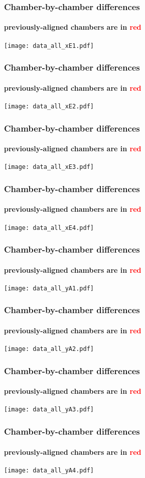 \documentclass[compress]{beamer}
\begin{document}
\begin{frame}
\frametitle{Chamber-by-chamber differences}
\framesubtitle{previously-aligned chambers are in \textcolor{red}{red}}
\texttt{[image: data\_all\_xE1.pdf]}
\end{frame}

\begin{frame}
\frametitle{Chamber-by-chamber differences}
\framesubtitle{previously-aligned chambers are in \textcolor{red}{red}}
\texttt{[image: data\_all\_xE2.pdf]}
\end{frame}

\begin{frame}
\frametitle{Chamber-by-chamber differences}
\framesubtitle{previously-aligned chambers are in \textcolor{red}{red}}
\texttt{[image: data\_all\_xE3.pdf]}
\end{frame}

\begin{frame}
\frametitle{Chamber-by-chamber differences}
\framesubtitle{previously-aligned chambers are in \textcolor{red}{red}}
\texttt{[image: data\_all\_xE4.pdf]}
\end{frame}

\begin{frame}
\frametitle{Chamber-by-chamber differences}
\framesubtitle{previously-aligned chambers are in \textcolor{red}{red}}
\texttt{[image: data\_all\_yA1.pdf]}
\end{frame}

\begin{frame}
\frametitle{Chamber-by-chamber differences}
\framesubtitle{previously-aligned chambers are in \textcolor{red}{red}}
\texttt{[image: data\_all\_yA2.pdf]}
\end{frame}

\begin{frame}
\frametitle{Chamber-by-chamber differences}
\framesubtitle{previously-aligned chambers are in \textcolor{red}{red}}
\texttt{[image: data\_all\_yA3.pdf]}
\end{frame}

\begin{frame}
\frametitle{Chamber-by-chamber differences}
\framesubtitle{previously-aligned chambers are in \textcolor{red}{red}}
\texttt{[image: data\_all\_yA4.pdf]}
\end{frame}
\end{document}
